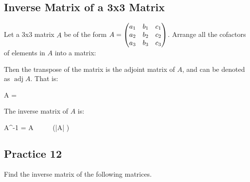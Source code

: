 \documentclass{report}
\begin{document}
\begin{multicols}{2}
  \subsection*{Inverse Matrix of a 3x3 Matrix}

  Let a 3x3 matrix $A$ be of the form $A = \begin{pmatrix} a_1 & b_1 & c_1 \\ a_2 & b_2 & c_2
      \\ a_3 & b_3 & c_3 \end{pmatrix}$. Arrange all the cofactors of elements in $A$ into a
  matrix:
  \begin{cequation}
  \end{cequation}

  Then the transpose of the matrix is the adjoint matrix of $A$, and can be
  denoted as $\operatorname{adj}A$. That is:
  \begin{cequation}
    A = 
  \end{cequation}
  The inverse matrix of $A$ is:
  \begin{cequation}
    A^{-1} =  A
    \ \ \ \ \ (|A| )
  \end{cequation}

  \subsection{Practice 12}

  Find the inverse matrix of the following matrices.


\end{multicols}
\end{document}
